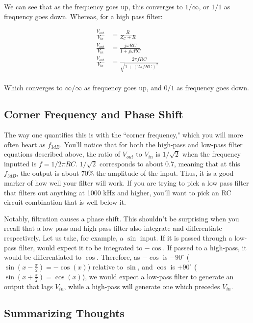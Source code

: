 \documentclass[12pt]{report}
\newcommand{\Vo}{{V}_{out}}
\newcommand{\Vi}{{V}_{in}}
\newcommand{\fdb}{{f}_{3dB}}
\begin{document}
We can see that as the frequency goes up, this converges to $1 / \infty$, or $1/1$ as frequency goes down. Whereas, for a high pass filter: 

\begin{equation} \label{filt1}
\begin{split}
\frac{\Vo}{\Vi} &= \frac{R}{Z_C + R} \\
\frac{\Vo}{\Vi} &= \frac{j\omega RC}{1 + j\omega RC} \\
\frac{\Vo}{\Vi} &= \frac{2\pi f RC}{\sqrt{1 + (2\pi f RC)^2}} \\
\end{split}
\end{equation}

Which converges to $\infty / \infty$ as frequency goes up, and $0 / 1$ as frequency goes down.

\subsection{Corner Frequency and Phase Shift}
The way one quantifies this is with the ``corner frequency," which you will more often heart as $\fdb$. You'll notice that for both the high-pass and low-pass filter equations described above, the ratio of $\Vo$ to $\Vi$ is $1/\sqrt{2}$ when the frequency inputted is $f = 1/2\pi RC$. $1/\sqrt{2}$ corresponds to about 0.7, meaning that at this $\fdb$, the output is about 70\% the amplitude of the input. Thus, it is a good marker of how well your filter will work. If you are trying to pick a low pass filter that filters out anything at 1000 kHz and higher, you'll want to pick an RC circuit combination that is well below it.\newline

Notably, filtration causes a phase shift. This shouldn't be surprising when you recall that a low-pass and high-pass filter also integrate and differentiate respectively. Let us take, for example, a $\sin$ input. If it is passed through a low-pass filter, would expect it to be integrated to $-\cos$. If passed to a high-pass, it would be differentiated to $\cos$. Therefore, as $-\cos$ is $-90^{\circ}$ ($\sin(x - \frac{\pi}{2}) = -\cos(x)$) relative to $\sin$, and $\cos$ is $+90^{\circ}$ ($\sin(x + \frac{\pi}{2}) = \cos(x)$), we would expect a low-pass filter to generate an output that lags $\Vi$, while a high-pass will generate one which precedes $\Vi$.\newline

\subsection{Summarizing Thoughts}
\end{document}
